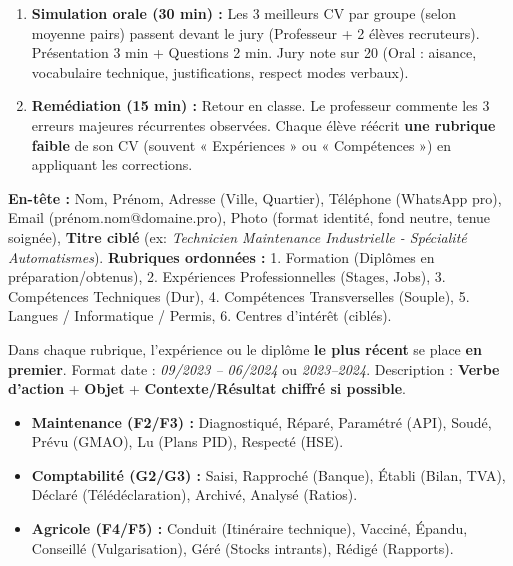 \documentclass[11pt]{article}
\newcounter{popsec}
\newcounter{popsub}
\newcommand{\courssub}[1]{%
  \stepcounter{popsub}%
  \par\vspace{9pt}\noindent{\popxbold\fontsize{11.5}{13}\selectfont\color{popink}{\color{poporange}\thepopsec.\thepopsub}\hspace{6pt}#1}\par\nopagebreak\vspace{4pt}
}
\begin{document}
\begin{enumerate}
    \item \textbf{Simulation orale (30 min) :} Les 3 meilleurs CV par groupe (selon moyenne pairs) passent devant le jury (Professeur + 2 élèves recruteurs). Présentation 3 min + Questions 2 min. Jury note sur 20 (Oral : aisance, vocabulaire technique, justifications, respect modes verbaux).
    \item \textbf{Remédiation (15 min) :} Retour en classe. Le professeur commente les 3 erreurs majeures récurrentes observées. Chaque élève réécrit \textbf{une rubrique faible} de son CV (souvent « Expériences » ou « Compétences ») en appliquant les corrections.
\end{enumerate}

\courssub{Ressources à mobiliser}
\begin{definition}
\textbf{En-tête :} Nom, Prénom, Adresse (Ville, Quartier), Téléphone (WhatsApp pro), Email (prénom.nom@domaine.pro), Photo (format identité, fond neutre, tenue soignée), \textbf{Titre ciblé} (ex: \emph{Technicien Maintenance Industrielle - Spécialité Automatismes}).
\textbf{Rubriques ordonnées :} 1. Formation (Diplômes en préparation/obtenus), 2. Expériences Professionnelles (Stages, Jobs), 3. Compétences Techniques (Dur), 4. Compétences Transverselles (Souple), 5. Langues / Informatique / Permis, 6. Centres d'intérêt (ciblés).
\end{definition}

\begin{propriete}
Dans chaque rubrique, l'expérience ou le diplôme \textbf{le plus récent} se place \textbf{en premier}. Format date : \emph{09/2023 -- 06/2024} ou \emph{2023--2024}. Description : \textbf{Verbe d'action} + \textbf{Objet} + \textbf{Contexte/Résultat chiffré si possible}.
\end{propriete}

\begin{methode}
\begin{itemize}
    \item \textbf{Maintenance (F2/F3) :} Diagnostiqué, Réparé, Paramétré (API), Soudé, Prévu (GMAO), Lu (Plans PID), Respecté (HSE).
    \item \textbf{Comptabilité (G2/G3) :} Saisi, Rapproché (Banque), Établi (Bilan, TVA), Déclaré (Télédéclaration), Archivé, Analysé (Ratios).
    \item \textbf{Agricole (F4/F5) :} Conduit (Itinéraire technique), Vacciné, Épandu, Conseillé (Vulgarisation), Géré (Stocks intrants), Rédigé (Rapports).
\end{itemize}
\end{methode}
\end{document}
